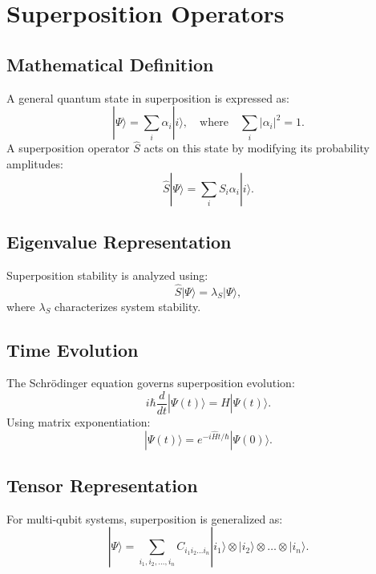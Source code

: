 \documentclass{article}
\theoremstyle{plain}
\begin{document}
\section{Superposition Operators}

\subsection{Mathematical Definition}
A general quantum state in superposition is expressed as:
\begin{equation}
    |\Psi\rangle = \sum_{i} \alpha_i |i\rangle, \quad \text{where} \quad \sum_{i} |\alpha_i|^2 = 1.
\end{equation}
A superposition operator $\hat{S}$ acts on this state by modifying its probability amplitudes:
\begin{equation}
    \hat{S} |\Psi\rangle = \sum_{i} S_i \alpha_i |i\rangle.
\end{equation}

\subsection{Eigenvalue Representation}
Superposition stability is analyzed using:
\begin{equation}
    \hat{S} |\Psi\rangle = \lambda_S |\Psi\rangle,
\end{equation}
where $\lambda_S$ characterizes system stability.

\subsection{Time Evolution}
The Schrödinger equation governs superposition evolution:
\begin{equation}
    i \hbar \frac{d}{dt} |\Psi(t)\rangle = \hat{H} |\Psi(t)\rangle.
\end{equation}
Using matrix exponentiation:
\begin{equation}
    |\Psi(t)\rangle = e^{-i \hat{H} t / \hbar} |\Psi(0)\rangle.
\end{equation}

\subsection{Tensor Representation}
For multi-qubit systems, superposition is generalized as:
\begin{equation}
    |\Psi\rangle = \sum_{i_1, i_2, \dots, i_n} C_{i_1 i_2 \dots i_n} |i_1\rangle \otimes |i_2\rangle \otimes \dots \otimes |i_n\rangle.
\end{equation}
\end{document}
